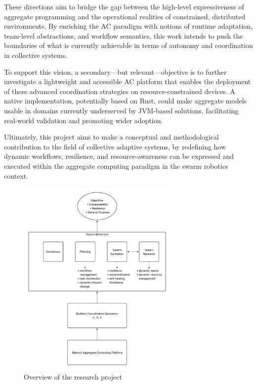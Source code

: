 \documentclass[12pt]{article}
\begin{document}
These directions aim to bridge the gap between the high-level expressiveness of aggregate programming and the operational realities of constrained, distributed environments. 
By enriching the AC paradigm with notions of runtime adaptation, team-level abstractions, and workflow semantics, this work intends to push the boundaries of what is currently 
achievable in terms of autonomy and coordination in collective systems.

To support this vision, a secondary—but relevant—objective is to further investigate a lightweight and accessible AC platform that enables the deployment of these advanced coordination strategies 
on resource-constrained devices. A native implementation, potentially based on Rust, could make aggregate models usable in domains currently underserved by JVM-based solutions, 
facilitating real-world validation and promoting wider adoption.

Ultimately, this project aims to make a conceptual and methodological contribution to the field of collective adaptive systems, by redefining how dynamic workflows, resilience, and resource-awareness 
can be expressed and executed within the aggregate computing paradigm in the swarm robotics context.

\begin{figure}
	\centering
	\includegraphics[width=0.7\textwidth]{figures/ResearchProject.png}
	\caption{Overview of the research project}
	 \label{fig:research-project}
\end{figure}
\end{document}
